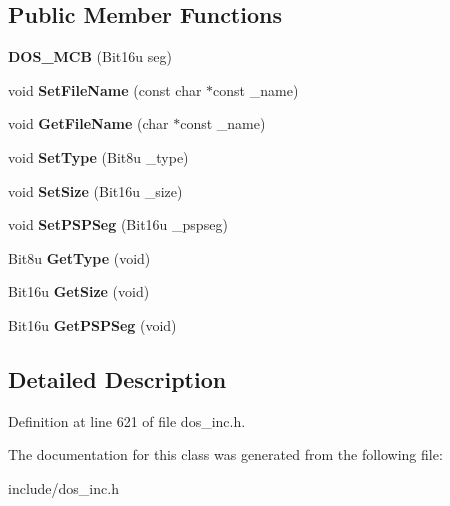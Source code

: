 \subsection*{Public Member Functions}
\begin{DoxyCompactItemize}
\item 
\hypertarget{classDOS__MCB_a0b1bf404720604aafd755212f8d06ffc}{{\bfseries D\-O\-S\-\_\-\-M\-C\-B} (Bit16u seg)}\label{classDOS__MCB_a0b1bf404720604aafd755212f8d06ffc}

\item 
\hypertarget{classDOS__MCB_adb5a8fae4d7777501c48f6fc783da385}{void {\bfseries Set\-File\-Name} (const char $\ast$const \-\_\-name)}\label{classDOS__MCB_adb5a8fae4d7777501c48f6fc783da385}

\item 
\hypertarget{classDOS__MCB_a9b76d148117232e7c4dceb0a7a990d3d}{void {\bfseries Get\-File\-Name} (char $\ast$const \-\_\-name)}\label{classDOS__MCB_a9b76d148117232e7c4dceb0a7a990d3d}

\item 
\hypertarget{classDOS__MCB_ab9545960540afa53f5ead1d49a48890e}{void {\bfseries Set\-Type} (Bit8u \-\_\-type)}\label{classDOS__MCB_ab9545960540afa53f5ead1d49a48890e}

\item 
\hypertarget{classDOS__MCB_a524e972434b1f0b57435a95d6dddd4b5}{void {\bfseries Set\-Size} (Bit16u \-\_\-size)}\label{classDOS__MCB_a524e972434b1f0b57435a95d6dddd4b5}

\item 
\hypertarget{classDOS__MCB_a4a0d73cdef5da789a59a2e141d69b0b6}{void {\bfseries Set\-P\-S\-P\-Seg} (Bit16u \-\_\-pspseg)}\label{classDOS__MCB_a4a0d73cdef5da789a59a2e141d69b0b6}

\item 
\hypertarget{classDOS__MCB_ab5aca8f3fe000215dd7a563a17a990f9}{Bit8u {\bfseries Get\-Type} (void)}\label{classDOS__MCB_ab5aca8f3fe000215dd7a563a17a990f9}

\item 
\hypertarget{classDOS__MCB_a133271b66d178a643a8090c2b3a8784d}{Bit16u {\bfseries Get\-Size} (void)}\label{classDOS__MCB_a133271b66d178a643a8090c2b3a8784d}

\item 
\hypertarget{classDOS__MCB_a3e8986ea9546d0d914202a41bd774288}{Bit16u {\bfseries Get\-P\-S\-P\-Seg} (void)}\label{classDOS__MCB_a3e8986ea9546d0d914202a41bd774288}

\end{DoxyCompactItemize}


\subsection{Detailed Description}


Definition at line 621 of file dos\-\_\-inc.\-h.



The documentation for this class was generated from the following file\-:\begin{DoxyCompactItemize}
\item 
include/dos\-\_\-inc.\-h\end{DoxyCompactItemize}
